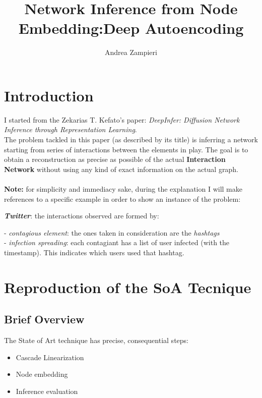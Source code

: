 \documentclass{article}
\author{Andrea Zampieri}
\title{Network Inference from Node Embedding:\newline Deep Autoencoding}
\begin{document}
	\maketitle
	\newpage
	\tableofcontents{}
	\newpage
	\section{Introduction} 
		I started from the Zekarias	T. Kefato's paper: \textit{DeepInfer: Diffusion Network Inference through Representation Learning}.\\
		The problem tackled in this paper (as described by its title) is inferring a network starting from series of interactions between the elements in play.
		The goal is to obtain a reconstruction as precise as possible of the actual \textbf{Interaction Network} without using any kind of exact information on the actual graph.\\ 
		\\
		\textbf{Note:} for simplicity and immediacy sake, during the explanation I will make references to a specific example in order to show an instance of the problem:\\
		
		\begin{addmargin}[2em]{0em}
			\textbf{\textit{Twitter}}: the interactions observed are formed by:\\
				\begin{addmargin}[2em]{0em}
					- \textit{contagious element}: the ones taken in consideration are the \textit{hashtags} \\
					- \textit{infection spreading}: each contagiant has a list of user infected (with the timestamp). This indicates which users used that hashtag.
				\end{addmargin}
		\end{addmargin}
	
	\section{Reproduction of the SoA Tecnique}
		\subsection{Brief Overview}
			The State of Art technique has precise, consequential steps:
			\begin{itemize}
				\item Cascade Linearization
				\item Node embedding
				\item Inference evaluation
			\end{itemize}
\end{document}
